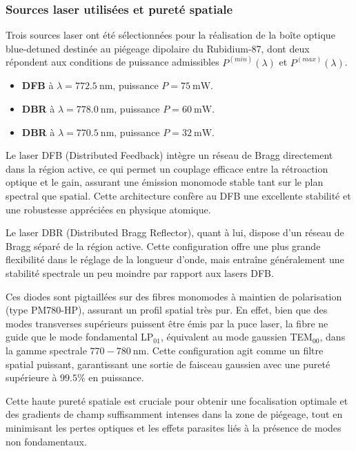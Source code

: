 \subsubsection*{Sources laser utilisées et pureté spatiale}

Trois sources laser ont été sélectionnées pour la réalisation de la boîte optique blue-detuned destinée au piégeage dipolaire du Rubidium-87, dont deux répondent aux conditions de puissance admissibles $P^{(min)}(\lambda)$ et $P^{(max)}(\lambda)$.

\begin{itemize}[label = $\bullet$]
    \item \textbf{DFB} à $\lambda = 772.5~\text{nm}$, puissance $P = 75~\text{mW}$.
    \item \textbf{DBR} à $\lambda = 778.0~\text{nm}$, puissance $P = 60~\text{mW}$. 
    \item \textbf{DBR} à $\lambda = 770.5~\text{nm}$, puissance $P = 32~\text{mW}$.
\end{itemize}

\medskip

Le laser DFB (Distributed Feedback) intègre un réseau de Bragg directement dans la région active, ce qui permet un couplage efficace entre la rétroaction optique et le gain, assurant une émission monomode stable tant sur le plan spectral que spatial. Cette architecture confère au DFB une excellente stabilité et une robustesse appréciées en physique atomique.

Le laser DBR (Distributed Bragg Reflector), quant à lui, dispose d’un réseau de Bragg séparé de la région active. Cette configuration offre une plus grande flexibilité dans le réglage de la longueur d’onde, mais entraîne généralement une stabilité spectrale un peu moindre par rapport aux lasers DFB.

\medskip

Ces diodes sont pigtaillées sur des fibres monomodes à maintien de polarisation (type PM780-HP), assurant un profil spatial très pur. En effet, bien que des modes transverses supérieurs puissent être émis par la puce laser, la fibre ne guide que le mode fondamental LP$_{01}$, équivalent au mode gaussien TEM$_{00}$, dans la gamme spectrale $770{-}780~\text{nm}$. Cette configuration agit comme un filtre spatial puissant, garantissant une sortie de faisceau gaussien avec une pureté supérieure à $99.5\%$ en puissance.

\medskip

Cette haute pureté spatiale est cruciale pour obtenir une focalisation optimale et des gradients de champ suffisamment intenses dans la zone de piégeage, tout en minimisant les pertes optiques et les effets parasites liés à la présence de modes non fondamentaux.

